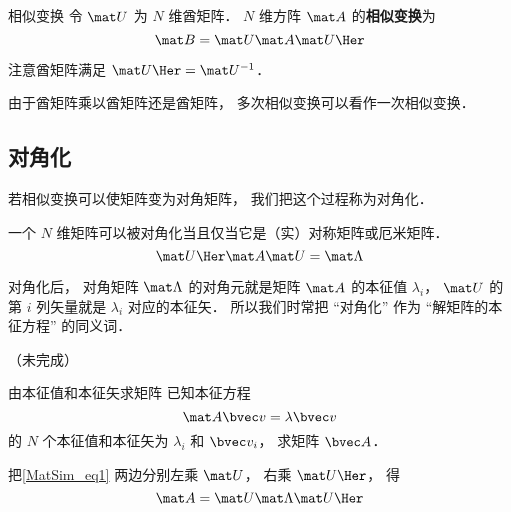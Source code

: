 

\begin{definition}{相似变换}
令 $\mat U$ 为 $N$ 维酋矩阵． $N$ 维方阵 $\mat A$ 的\textbf{相似变换}为
\begin{equation}
\mat B = \mat U \mat A \mat U\Her
\end{equation}
\end{definition}

注意酋矩阵满足 $\mat U\Her = \mat U^{-1}$．

由于酋矩阵乘以酋矩阵还是酋矩阵， 多次相似变换可以看作一次相似变换．

\subsection{对角化}
若相似变换可以使矩阵变为对角矩阵， 我们把这个过程称为对角化．

一个 $N$ 维矩阵可以被对角化当且仅当它是（实）对称矩阵或厄米矩阵．
\begin{equation}\label{MatSim_eq1}
\mat U\Her \mat A \mat U = \mat \Lambda
\end{equation}

对角化后， 对角矩阵 $\mat \Lambda$ 的对角元就是矩阵 $\mat A$ 的本征值 $\lambda_i$， $\mat U$ 的第 $i$ 列矢量就是 $\lambda_i$ 对应的本征矢． 所以我们时常把 “对角化” 作为 “解矩阵的本征方程” 的同义词．

（未完成）

\begin{example}{由本征值和本征矢求矩阵}
已知本征方程
\begin{equation}
\mat A \bvec v = \lambda \bvec v
\end{equation}
的 $N$ 个本征值和本征矢为 $\lambda_i$ 和 $\bvec v_i$， 求矩阵 $\bvec A$．

把\autoref{MatSim_eq1} 两边分别左乘 $\mat U$， 右乘 $\mat U\Her$， 得
\begin{equation}
\mat A = \mat U \mat \Lambda \mat U\Her
\end{equation}
\end{example}
